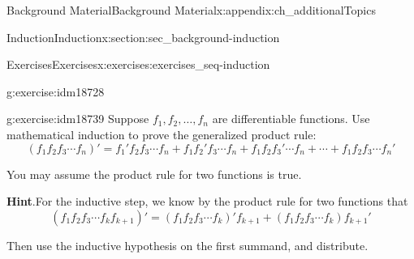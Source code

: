 \documentclass[oneside,10pt,]{book}
\numberwithin{equation}{chapter}
\begin{document}
\begin{appendixptx}{Background Material}{}{Background Material}{}{}{x:appendix:ch_additionalTopics}
\begin{sectionptx}{Induction}{}{Induction}{}{}{x:section:sec_background-induction}
\begin{exercises-subsection}{Exercises}{}{Exercises}{}{}{x:exercises:exercises_seq-induction}
\begin{divisionexercise}{22}{}{}{g:exercise:idm18728}
\end{divisionexercise}%
\begin{divisionexercise}{23}{}{}{g:exercise:idm18739}%
Suppose \(f_1, f_2, \ldots, f_n\) are differentiable functions. Use mathematical induction to prove the generalized product rule:%
\begin{equation*}
(f_1 f_2 f_3 \cdots f_n)' = f_1' f_2 f_3 \cdots f_n + f_1 f_2' f_3 \cdots f_n + f_1 f_2 f_3' \cdots f_n + \cdots + f_1 f_2 f_3 \cdots f_n'
\end{equation*}
%
\par
You may assume the product rule for two functions is true.%
\par\smallskip%
\noindent\textbf{Hint}.\hypertarget{g:hint:idm18745}{}\quad{}For the inductive step, we know by the product rule for two functions that%
\begin{equation*}
(f_1f_2f_3 \cdots f_k f_{k+1})' = (f_1f_2f_3\cdots f_k)'f_{k+1} + (f_1f_2f_3\cdots f_k)f_{k+1}'
\end{equation*}
%
\par
Then use the inductive hypothesis on the first summand, and distribute.%
\end{divisionexercise}%
\end{exercises-subsection}
\end{sectionptx}
\end{appendixptx}
%
%
\typeout{************************************************}
\typeout{************************************************}
%
\end{document}
